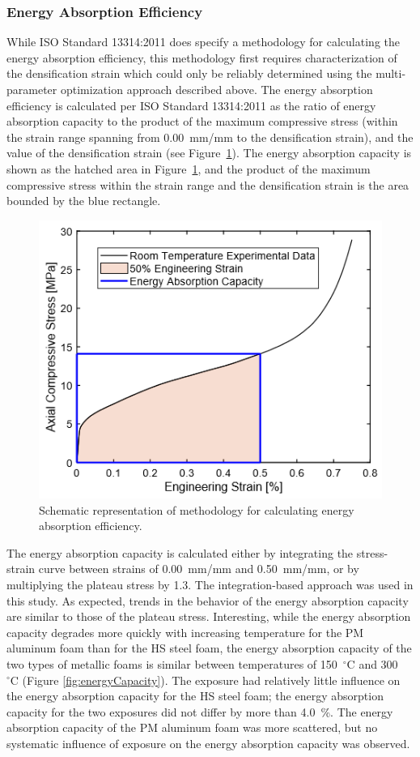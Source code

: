 \documentclass[review]{elsarticle}
\begin{document}
\subsubsection{Energy Absorption Efficiency}

While ISO Standard 13314:2011 does specify a methodology for calculating the energy absorption efficiency, this methodology first requires characterization of the densification strain which could only be reliably determined using the multi-parameter optimization approach described above. The energy absorption efficiency is calculated per ISO Standard 13314:2011 as the ratio of energy absorption capacity to the product of the maximum compressive stress (within the strain range spanning from 0.00~mm/mm to the densification strain), and the value of the densification strain (see Figure~\ref{EnAbsEffExpl}). The energy absorption capacity is shown as the hatched area in Figure~\ref{EnAbsEffExpl}, and the product of the maximum compressive stress within the strain range and the densification strain is the area bounded by the blue rectangle.

\begin{figure}[htbp]
	\begin{center}
		\includegraphics[width=0.60\linewidth]
		{Tex-Figures/Fig20-energyAbsorptionEfficiency.png}
		\vspace{-0.2cm}
		\caption{Schematic representation of methodology for calculating energy absorption efficiency.}
		\label{EnAbsEffExpl}
	\end{center}
\end{figure}

The energy absorption capacity is calculated either by integrating the stress-strain curve between strains of 0.00~mm/mm and 0.50~mm/mm, or by multiplying the plateau stress by 1.3. The integration-based approach was used in this study. As expected, trends in the behavior of the energy absorption capacity are similar to those of the plateau stress. Interesting, while the energy absorption capacity degrades more quickly with increasing temperature for the PM aluminum foam than for the HS steel foam, the energy absorption capacity of the two types of metallic foams is similar between temperatures of 150~$^{\circ}\mathrm{C}$ and 300~$^{\circ}\mathrm{C}$ (Figure \ref{fig:energyCapacity}). The exposure had relatively little influence on the energy absorption capacity for the HS steel foam; the energy absorption capacity for the two exposures did not differ by more than 4.0~\%. The energy absorption capacity of the PM aluminum foam was more scattered, but no systematic influence of exposure on the energy absorption capacity was observed.
\end{document}
